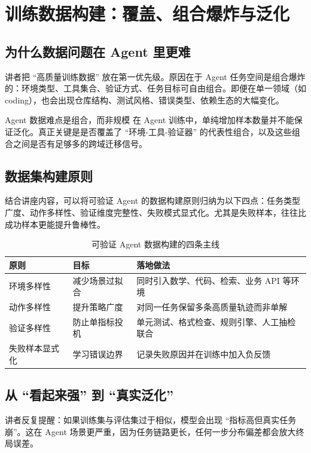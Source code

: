 \documentclass[a4paper]{article}
\begin{document}
\section{训练数据构建：覆盖、组合爆炸与泛化}

\subsection{为什么数据问题在 Agent 里更难}
讲者把 ``高质量训练数据'' 放在第一优先级。原因在于 Agent 任务空间是组合爆炸的：环境类型、工具集合、验证方式、任务目标可自由组合。即便在单一领域（如 coding），也会出现仓库结构、测试风格、错误类型、依赖生态的大幅变化。

\begin{importantbox}{Agent 数据难点是组合，而非规模}
在 Agent 训练中，单纯增加样本数量并不能保证泛化。真正关键是是否覆盖了 ``环境-工具-验证器'' 的代表性组合，以及这些组合之间是否有足够多的跨域迁移信号。
\end{importantbox}

\subsection{数据集构建原则}
结合讲座内容，可以将可验证 Agent 的数据构建原则归纳为以下四点：任务类型广度、动作多样性、验证维度完整性、失败模式显式化。尤其是失败样本，往往比成功样本更能提升鲁棒性。

\begin{table}[H]
\centering
\begin{tabular}{p{2.4cm}p{3.7cm}p{5.4cm}}
\toprule
\textbf{原则} & \textbf{目标} & \textbf{落地做法} \\
\midrule
环境多样性 & 减少场景过拟合 & 同时引入数学、代码、检索、业务 API 等环境 \\
动作多样性 & 提升策略广度 & 对同一任务保留多条高质量轨迹而非单解 \\
验证多样性 & 防止单指标投机 & 单元测试、格式检查、规则引擎、人工抽检联合 \\
失败样本显式化 & 学习错误边界 & 记录失败原因并在训练中加入负反馈 \\
\bottomrule
\end{tabular}
\caption{可验证 Agent 数据构建的四条主线}
\end{table}

\subsection{从 ``看起来强'' 到 ``真实泛化''}
讲者反复提醒：如果训练集与评估集过于相似，模型会出现 ``指标高但真实任务崩''。这在 Agent 场景更严重，因为任务链路更长，任何一步分布偏差都会放大终局误差。
\end{document}
